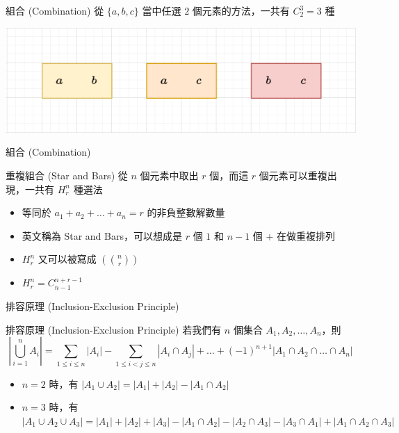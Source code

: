 \documentclass[aspectratio=169]{beamer}
\begin{document}
\begin{frame}{組合 (Combination)}
    從 $\{a,b,c\}$ 當中任選 $2$ 個元素的方法，一共有 $C^3_2 = 3$ 種
    \begin{center}
        \includegraphics[width=\textwidth]{images/combination.png}
    \end{center}
\end{frame}

\begin{frame}{組合 (Combination)}
    \begin{alertblock}{重複組合 (Star and Bars)}
        從 $n$ 個元素中取出 $r$ 個，而這 $r$ 個元素可以重複出現，一共有 $H^n_r$ 種選法
        \begin{itemize}
            \item 等同於 $a_1+a_2+\dots+a_n = r$ 的非負整數解數量
            \item 英文稱為 Star and Bars，可以想成是 $r$ 個 $1$ 和 $n-1$ 個 $+$ 在做重複排列
            \item $H^n_r$ 又可以被寫成 $\displaystyle \left(\!\!{\binom {n}{r}}\!\!\right)$
            \item $H^n_r = C^{n+r-1}_{n-1}$ 
        \end{itemize}
    \end{alertblock}
\end{frame}

\begin{frame}{排容原理 (Inclusion-Exclusion Principle)}
    \begin{alertblock}{排容原理 (Inclusion-Exclusion Principle)}
        若我們有 $n$ 個集合 $A_1,A_2,\dots,A_n$，則
        $$\left|\bigcup^n_{i=1} A_i\right| = \sum_{1 \le i \le n} |A_i| - \sum_{1 \le i < j \le n} |A_i \cap A_j| + \dots + (-1)^{n+1} |A_1 \cap A_2 \cap \dots \cap A_n| $$
        \vspace{5mm}
        \begin{itemize}
            \item $n=2$ 時，有 $|A_1 \cup A_2| = |A_1| + |A_2| - |A_1 \cap A_2|$
            \item $n=3$ 時，有 $|A_1 \cup A_2 \cup A_3| = |A_1| + |A_2| + |A_3| - |A_1 \cap A_2| - |A_2 \cap A_3| - |A_3 \cap A_1| + |A_1 \cap A_2 \cap A_3|$
        \end{itemize}
    \end{alertblock}
\end{frame}
\end{document}
